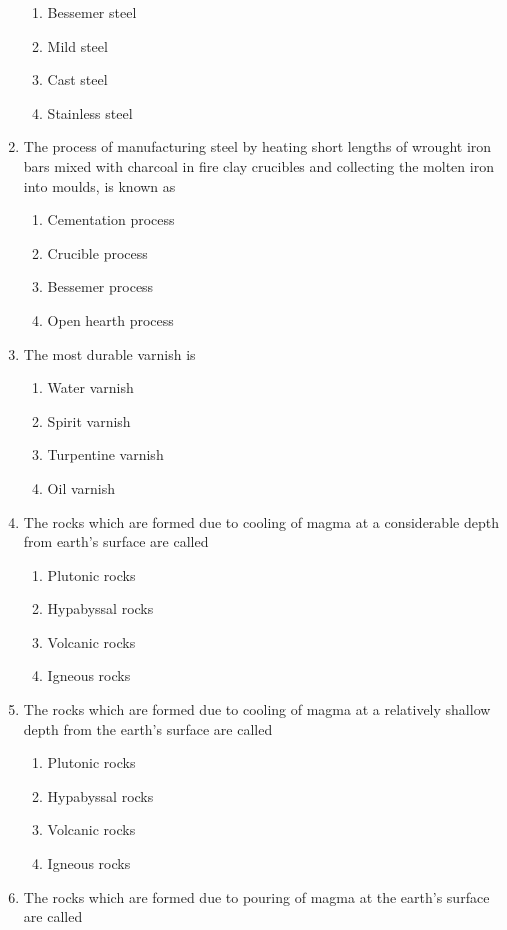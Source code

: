 \documentclass[11pt,a4paper]{article}
\begin{document}
\begin{enumerate}
\begin{enumerate}[label=\Alph*.]
\item{Bessemer steel}
\item{Mild steel}
\item{Cast steel}
\item{Stainless steel}
\end{enumerate}
\item{The process of manufacturing steel by heating short lengths of wrought iron bars mixed with charcoal in fire clay crucibles and collecting the molten iron into moulds, is known as}
\begin{enumerate}[label=\Alph*.]
\item{Cementation process}
\item{Crucible process}
\item{Bessemer process}
\item{Open hearth process}
\end{enumerate}
\item{The most durable varnish is}
\begin{enumerate}[label=\Alph*.]
\item{Water varnish}
\item{Spirit varnish}
\item{Turpentine varnish}
\item{Oil varnish}
\end{enumerate}
\item{The rocks which are formed due to cooling of magma at a considerable depth from earth's surface are called}
\begin{enumerate}[label=\Alph*.]
\item{Plutonic rocks}
\item{Hypabyssal rocks}
\item{Volcanic rocks}
\item{Igneous rocks}
\end{enumerate}
\item{The rocks which are formed due to cooling of magma at a relatively shallow depth from the earth's surface are called}
\begin{enumerate}[label=\Alph*.]
\item{Plutonic rocks}
\item{Hypabyssal rocks}
\item{Volcanic rocks}
\item{Igneous rocks}
\end{enumerate}
\item{The rocks which are formed due to pouring of magma at the earth's surface are called}
\begin{enumerate}[label=\Alph*.]

\end{enumerate}
\end{enumerate}
\end{document}

